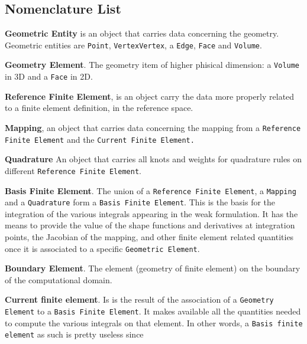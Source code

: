 \subsection{Nomenclature List}
\begin{description}
  
\item\textbf{Geometric Entity} is an object
  that carries data concerning the geometry. Geometric entities are
  \texttt{Point}, \texttt{Vertex}\texttt{Vertex}, a
  \texttt{Edge}, \texttt{Face} and
  \texttt{Volume}.
\item\textbf{Geometry Element}. The geometry item of higher phisical
  dimension: a \texttt{Volume} in 3D and a \texttt{Face} in 2D.
\item\textbf{Reference Finite Element},
  is an object carry the data more properly related to a finite element
  definition, in the reference space.
\item\textbf{Mapping}, an object that carries data concerning the mapping
  from a \texttt{Reference Finite Element} and the \texttt{Current
    Finite Element.}
\item\textbf{Quadrature} An object that carries all
  knots and weights for quadrature rules on different \texttt{Reference
    Finite Element}.
\item\textbf{Basis Finite Element}. The union of a
  \texttt{Reference Finite Element}, a \texttt{Mapping} and a
  \texttt{Quadrature} form a \texttt{Basis Finite Element}. This is the
  basis for the integration of the various integrals appearing in the
  weak formulation. It has the means to provide the value of the shape
  functions and derivatives at integration points, the Jacobian of the
  mapping, and other finite element related quantities once it is
  associated to a specific \texttt{Geometric Element}.
\item\textbf{Boundary Element}. The element
  (geometry of finite element) on the boundary of the computational
  domain.
\item\textbf{Current finite element}. Is
  is the result of the association of a \texttt{Geometry Element} to a
  \texttt{Basis Finite Element}. It makes available all the quantities
  needed to compute the various integrals on that element. In other
  words, a \texttt{Basis finite element} as such is pretty useless since

\end{description}

